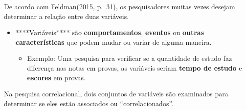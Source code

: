 \documentclass[
]{book}
\providecommand{\tightlist}{%
  \setlength{\itemsep}{0pt}\setlength{\parskip}{0pt}}
\begin{document}
De acordo com Feldman(2015, p.~31), os pesquisadores muitas vezes desejam determinar a relação entre duas variáveis.

\begin{itemize}
\tightlist
\item
  ****Variáveis**** são \textbf{comportamentos}, \textbf{eventos} ou \textbf{outras características} que podem mudar ou variar de alguma maneira.

  \begin{itemize}
  \tightlist
  \item
    Exemplo: Uma pesquisa para verificar se a quantidade de estudo faz diferença nas notas em provas, as
    variáveis seriam \textbf{tempo de estudo} e \textbf{escores} em provas.
  \end{itemize}
\end{itemize}

Na pesquisa correlacional, dois conjuntos de variáveis são examinados para determinar se eles estão associados ou ``correlacionados''.
\end{document}
